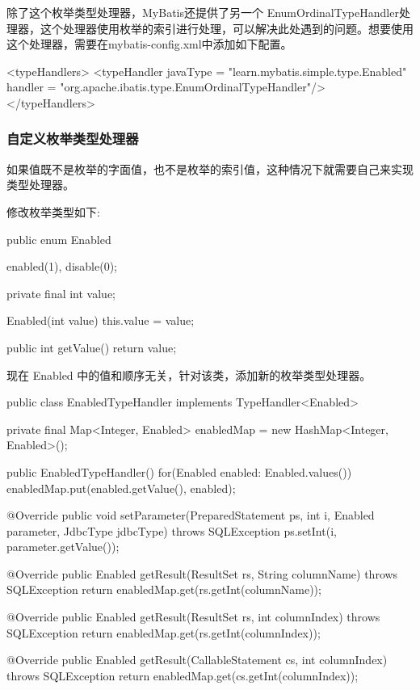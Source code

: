 除了这个枚举类型处理器，MyBatis还提供了另一个 EnumOrdinalTypeHandler处理器，这个处理器使用枚举的索引进行处理，可以解决此处遇到的问题。想要使用这个处理器，需要在mybatis-config.xml中添加如下配置。

\begin{xml}
<typeHandlers>
    <typeHandler javaType = "learn.mybatis.simple.type.Enabled" handler = "org.apache.ibatis.type.EnumOrdinalTypeHandler"/>
</typeHandlers>
\end{xml}

\subsubsection{自定义枚举类型处理器}

如果值既不是枚举的字面值，也不是枚举的索引值，这种情况下就需要自己来实现类型处理器。

修改枚举类型如下:
\begin{Java}
public enum Enabled {
    enabled(1), disable(0);

    private final int value;

    Enabled(int value) {
        this.value = value;
    }

    public int getValue() {
        return value;
    }
}
\end{Java}

现在 Enabled 中的值和顺序无关，针对该类，添加新的枚举类型处理器。

\begin{Java}
public class EnabledTypeHandler implements TypeHandler<Enabled> {
    private final Map<Integer, Enabled> enabledMap = new HashMap<Integer, Enabled>();

    public EnabledTypeHandler() {
        for(Enabled enabled: Enabled.values()) {
            enabledMap.put(enabled.getValue(), enabled);
        }
    }

    @Override
    public void setParameter(PreparedStatement ps, int i, Enabled parameter, JdbcType jdbcType) throws SQLException {
        ps.setInt(i, parameter.getValue());
    }

    @Override
    public Enabled getResult(ResultSet rs, String columnName) throws SQLException {
        return enabledMap.get(rs.getInt(columnName));
    }

    @Override
    public Enabled getResult(ResultSet rs, int columnIndex) throws SQLException {
        return enabledMap.get(rs.getInt(columnIndex));
    }

    @Override
    public Enabled getResult(CallableStatement cs, int columnIndex) throws SQLException {
        return enabledMap.get(cs.getInt(columnIndex));
    }
}
\end{Java}

